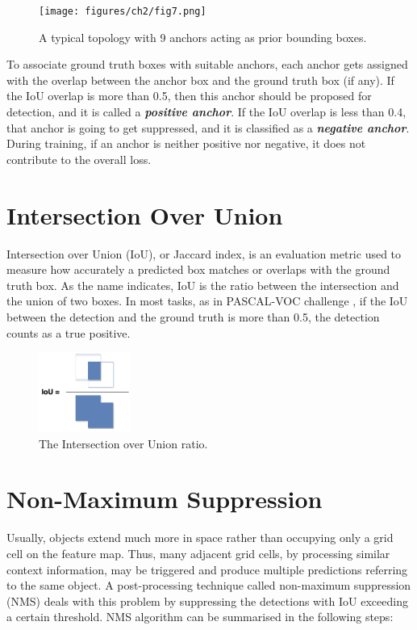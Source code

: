 \begin{figure}[!htb]
  \centering
  \texttt{[image: figures/ch2/fig7.png]}
  \caption{A typical topology with 9 anchors acting as prior bounding boxes.}
  \label{fig7}
\end{figure} 

To associate ground truth boxes with suitable anchors, each anchor gets assigned with the overlap between the anchor box and the ground truth box (if any). If the IoU overlap is more than 0.5, then this anchor should be proposed for detection, and it is called a \textbf{\textit{positive anchor}}. If the IoU overlap is less than 0.4, that anchor is going to get suppressed, and it is classified as a \textbf{\textit{negative anchor}}. During training, if an anchor is neither positive nor negative, it does not contribute to the overall loss.

\section{Intersection Over Union}
Intersection over Union (IoU), or Jaccard index, is an evaluation metric used to measure how accurately a predicted box matches or overlaps with the ground truth box. As the name indicates, IoU is the ratio between the intersection and the union of two boxes. In most tasks, as in PASCAL-VOC challenge \cite{everingham2010pascal}, if the IoU between the detection and the ground truth is more than 0.5, the detection counts as a true positive.

\begin{figure}[!htb]
  \centering
  \includegraphics[width=3cm]{figures/ch2/fig8.png}
  \caption{The Intersection over Union ratio.}
  \label{fig8}
\end{figure} 

\section{Non-Maximum Suppression}
Usually, objects extend much more in space rather than occupying only a grid cell on the feature map. Thus, many adjacent grid cells, by processing similar context information, may be triggered and produce multiple predictions referring to the same object. A post-processing technique called non-maximum suppression (NMS) deals with this problem by suppressing the detections with IoU exceeding a certain threshold. NMS algorithm can be summarised in the following steps:

